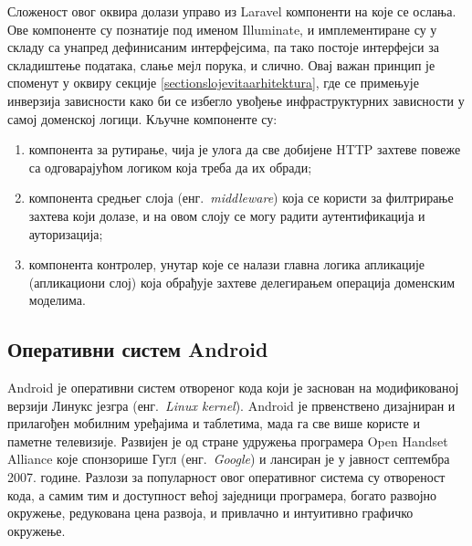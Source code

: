 \documentclass[12pt,oneside]{memoir}
\begin{document}
Сложеност овог оквира долази управо из Laravel компоненти на које се ослања. Ове компоненте су познатије под именом Illuminate, и имплементиране су у складу са унапред дефинисаним интерфејсима, па тако постоје интерфејси за складиштење података, слање мејл порука, и слично. Овај важан принцип је споменут у оквиру секције \ref{sectionslojevitaarhitektura}, где се примењује инверзија зависности како би се избегло увођење инфраструктурних зависности у самој доменској логици. Кључне компоненте су:
\begin{enumerate}
\item компонента за рутирање, чија је улога да све добијене HTTP захтеве повеже са одговарајућом логиком која треба да их обради;
\item компонента средњег слоја (енг.~\textit{middleware}) која се користи за филтрирање захтева који долазе, и на овом слоју се могу радити аутентификација и ауторизација;
\item компонента контролер, унутар које се налази главна логика апликације (апликациони слој) која обрађује захтеве делегирањем операција доменским моделима.
\end{enumerate}

\subsection{Оперативни систем Android}
Android \cite{Android} је оперативни систем отвореног кода који је заснован на модификованој верзији Линукс језгра (енг.~\textit{Linux kernel}). Android је првенствено дизајниран и прилагођен мобилним уређајима и таблетима, мада га све више користе и паметне телевизије. Развијен је од стране удружења програмера Open Handset Alliance које спонзорише Гугл (енг.~\textit{Google}) и лансиран је у јавност септембра 2007. године. Разлози за популарност овог оперативног система су отвореност кода, а самим тим и доступност већој заједници програмера, богато развојно окружење, редукована цена развоја, и привлачно и интуитивно графичко окружење.
\end{document}
